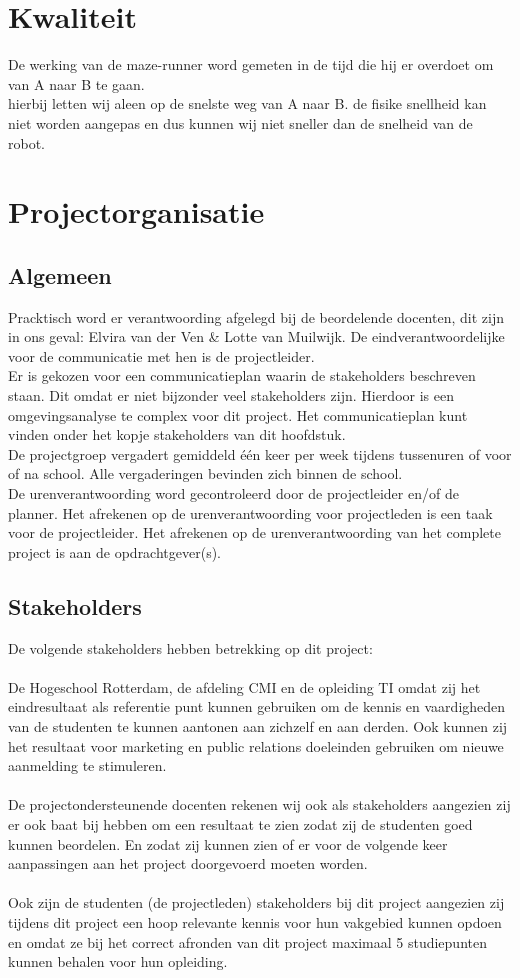 \documentclass[oneside]{book}
\begin{document}
\chapter{Kwaliteit}
	De werking van de maze-runner word gemeten in de tijd die hij er overdoet om van A naar B te gaan.\\
	hierbij letten wij aleen op de snelste weg van A naar B. de fisike snellheid kan niet worden aangepas en dus kunnen wij niet sneller dan de snelheid van de robot.
\clearpage
\chapter{Projectorganisatie}
\section{Algemeen}
Pracktisch word er verantwoording afgelegd bij de beordelende docenten, dit zijn in ons geval: Elvira van der Ven \& Lotte van Muilwijk.
De eindverantwoordelijke voor de communicatie met hen is de projectleider.\\
Er is gekozen voor een communicatieplan waarin de stakeholders beschreven staan.
Dit omdat er niet bijzonder veel stakeholders zijn.
Hierdoor is een omgevingsanalyse te complex voor dit project.
Het communicatieplan kunt vinden onder het kopje stakeholders van dit hoofdstuk.\\
De projectgroep vergadert gemiddeld één keer per week tijdens tussenuren of voor of na school.
Alle vergaderingen bevinden zich binnen de school.\\
De urenverantwoording word gecontroleerd door de projectleider en/of de planner.
Het afrekenen op de urenverantwoording voor projectleden is een taak voor de projectleider.
Het afrekenen op de urenverantwoording van het complete project is aan de opdrachtgever(s).
\section{Stakeholders}
De volgende stakeholders hebben betrekking op dit project:\\
\\
De Hogeschool Rotterdam, de afdeling CMI en de opleiding TI omdat zij het eindresultaat als
referentie punt kunnen gebruiken om de kennis en vaardigheden van de studenten te kunnen
aantonen aan zichzelf en aan derden.
Ook kunnen zij het resultaat voor marketing en public relations doeleinden gebruiken om nieuwe
aanmelding te stimuleren.\\
\\
De projectondersteunende docenten rekenen wij ook als stakeholders aangezien zij er ook baat bij hebben om een resultaat te zien zodat zij de studenten goed kunnen beordelen.
En zodat zij kunnen zien of er voor de volgende keer aanpassingen aan het project doorgevoerd
moeten worden.\\
\\
Ook zijn de studenten (de projectleden) stakeholders bij dit project aangezien zij tijdens dit project
een hoop relevante kennis voor hun vakgebied kunnen opdoen en omdat ze bij het correct afronden
van dit project maximaal 5 studiepunten kunnen behalen voor hun opleiding.
\clearpage
\end{document}
